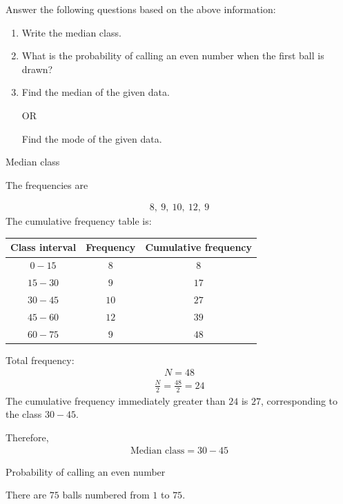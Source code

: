 \begin{enumerate}[label=\thesubsection.\arabic*, ref=\thesubsection.\theenumi]
Answer the following questions based on the above information:

\begin{enumerate}
    \item[\brak{i}] Write the median class.
    \item[\brak{ii}] What is the probability of calling an even number when the first ball is drawn?
    \item[\brak{iii}]  Find the median of the given data.
    
    OR
    
     Find the mode of the given data.
\end{enumerate}

\solution

 Median class

The frequencies are

\begin{align}
8,\ 9,\ 10,\ 12,\ 9
\end{align}
The cumulative frequency table is:

\begin{center}
\begin{tabular}{|c|c|c|}
\hline
Class interval & Frequency & Cumulative frequency \\
\hline
\(0-15\) & \(8\) & \(8\) \\
\hline
\(15-30\) & \(9\) & \(17\) \\
\hline
\(30-45\) & \(10\) & \(27\) \\
\hline
\(45-60\) & \(12\) & \(39\) \\
\hline
\(60-75\) & \(9\) & \(48\) \\
\hline
\end{tabular}
\end{center}

Total frequency:
\begin{align}
N=48
\end{align}
\begin{align}
\frac{N}{2}=\frac{48}{2}=24
\end{align}
The cumulative frequency immediately greater than \(24\) is \(27\), corresponding to the class \(30-45\).

Therefore,
\begin{align}
\text{Median class}=30-45
\end{align}

 Probability of calling an even number

There are \(75\) balls numbered from \(1\) to \(75\).


\end{enumerate}
